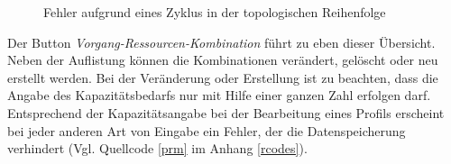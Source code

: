 \documentclass[a4paper,12pt,parskip,bibtotoc,liststotoc]{article}
\begin{document}
\begin{figure}[h!]
  \begin{center}
    \caption{Fehler aufgrund eines Zyklus in der topologischen Reihenfolge}  \label{VorErr}
  \end{center}
\end{figure}
 
Der Button \textit{Vorgang-Ressourcen-Kombination} führt zu eben dieser Übersicht. Neben der Auflistung können die Kombinationen verändert, gelöscht oder neu erstellt werden. Bei der Veränderung oder Erstellung ist zu beachten, dass die Angabe des Kapazitätsbedarfs nur mit Hilfe einer ganzen Zahl erfolgen darf. Entsprechend der Kapazitätsangabe bei der Bearbeitung eines Profils erscheint bei jeder anderen Art von Eingabe ein Fehler, der die Datenspeicherung verhindert (Vgl. Quellcode \ref{prm} im Anhang \ref{rcodes}).\\
\end{document}
